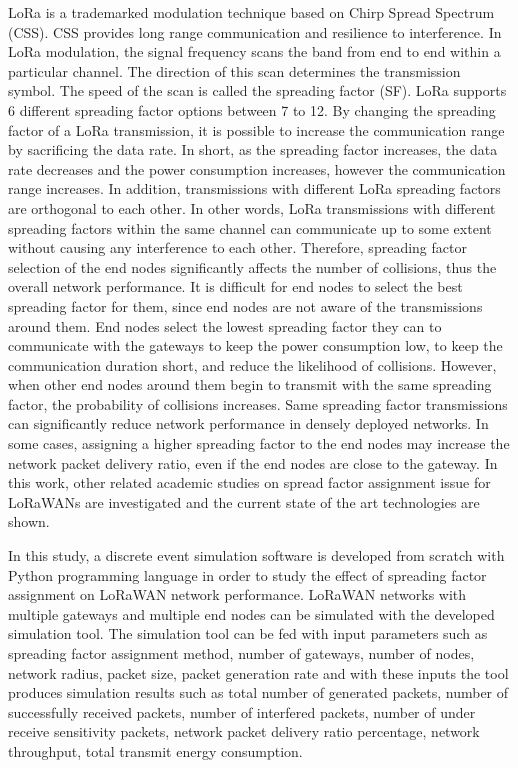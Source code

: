 LoRa is a trademarked modulation technique based on Chirp Spread Spectrum (CSS). CSS provides long range communication and resilience to interference. In LoRa modulation, the signal frequency scans the band from end to end within a particular channel. The direction of this scan determines the transmission symbol. The speed of the scan is called the spreading factor (SF). LoRa supports 6 different spreading factor options between 7 to 12. By changing the spreading factor of a LoRa transmission, it is possible to increase the communication range by sacrificing the data rate. In short, as the spreading factor increases, the data rate decreases and the power consumption increases, however the communication range increases. In addition, transmissions with different LoRa spreading factors are orthogonal to each other. In other words, LoRa transmissions with different spreading factors within the same channel can communicate up to some extent without causing any interference to each other. Therefore, spreading factor selection of the end nodes significantly affects the number of collisions, thus the overall network performance. It is difficult for end nodes to select the best spreading factor for them, since end nodes are not aware of the transmissions around them. End nodes select the lowest spreading factor they can to communicate with the gateways to keep the power consumption low, to keep the communication duration short, and reduce the likelihood of collisions. However, when other end nodes around them begin to transmit with the same spreading factor, the probability of collisions increases. Same spreading factor transmissions can significantly reduce network performance in densely deployed networks. In some cases, assigning a higher spreading factor to the end nodes may increase the network packet delivery ratio, even if the end nodes are close to the gateway. In this work, other related academic studies on spread factor assignment issue for LoRaWANs are investigated and the current state of the art technologies are shown.

In this study, a discrete event simulation software is developed from scratch with Python programming language in order to study the effect of spreading factor assignment on LoRaWAN network performance. LoRaWAN networks with multiple gateways and multiple end nodes can be simulated with the developed simulation tool. The simulation tool can be fed with input parameters such as spreading factor assignment method, number of gateways, number of nodes, network radius, packet size, packet generation rate and with these inputs the tool produces simulation results such as total number of generated packets, number of successfully received packets, number of interfered packets, number of under receive sensitivity packets, network packet delivery ratio percentage, network throughput, total transmit energy consumption.


